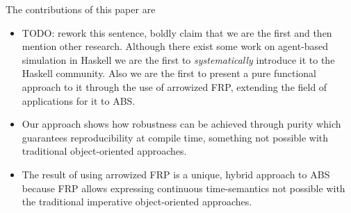 The contributions of this paper are 
\begin{itemize}
	\item TODO: rework this sentence, boldly claim that we are the first and then mention other research. Although there exist some work on agent-based simulation in Haskell we are the first to \textit{systematically} introduce it to the Haskell community. Also we are the first to present a pure functional approach to it through the use of arrowized FRP, extending the field of applications for it to ABS.
	\item Our approach shows how robustness can be achieved through purity which guarantees reproducibility at compile time, something not possible with traditional object-oriented approaches.
	\item The result of using arrowized FRP is a unique, hybrid approach to ABS because FRP allows expressing continuous time-semantics not possible with the traditional imperative object-oriented approaches.
\end{itemize}